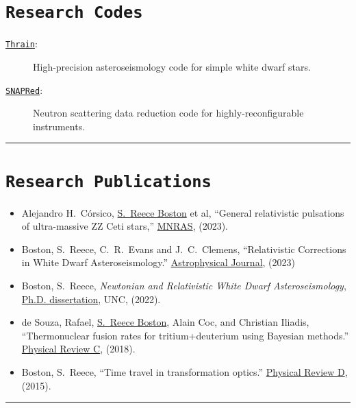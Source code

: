 \documentclass[11pt, letter]{article}
\begin{document}
\section*{\tt Research Codes}
\begin{minipage}{\textwidth}
	\begin{description}
		\item[\href{https://github.com/rboston628/thrain}{\tt Thrain}:] High-precision asteroseismology code for simple white dwarf stars.
		\item[\href{https://github.com/neutrons/SNAPRed}{\tt SNAPRed}:] Neutron scattering data reduction code for highly-reconfigurable instruments.
	\end{description}
\hrule
\end{minipage}
\vspace{-0.5\baselineskip}

\section*{\tt Research Publications}
\begin{minipage}{\textwidth}
%
\begin{itemize}
		\item Alejandro H.~C\'orsico, \underline{S.~Reece Boston} et al, 
			``General relativistic pulsations of ultra-massive ZZ Ceti stars,'' 
			\href{https://doi.org/10.1093/mnras/stad2248}{MNRAS}, 
			(2023).
		\item Boston, S.~Reece, C.~R.~Evans and J.~C.~Clemens, 
			``Relativistic Corrections in White Dwarf Asteroseismology.'' 
			\href{https://iopscience.iop.org/article/10.3847/1538-4357/acd446}{Astrophysical Journal}, (2023)
		\item Boston, S.~Reece, 
			\emph{Newtonian and Relativistic White Dwarf Asteroseismology}, 
			\\\href{https://cdr.lib.unc.edu/concern/dissertations/jw827n44n?locale=en}{Ph.D. dissertation}, 
			UNC, (2022).
		\item de Souza, Rafael, \underline{S.~Reece Boston}, Alain Coc, and Christian Iliadis, 
			``Thermonuclear fusion rates for tritium+deuterium using Bayesian methods.''  
			\href{http://journals.aps.org/prc/abstract/10.1103/PhysRevC.99.014619}{Physical Review C}, 
			(2018).
		\item Boston, S.~Reece, 
			``Time travel in transformation optics.''  
			\href{http://journals.aps.org/prd/abstract/10.1103/PhysRevD.91.124035}{Physical Review D}, 
			(2015).
\end{itemize}
\hrule
\end{minipage}
\end{document}
